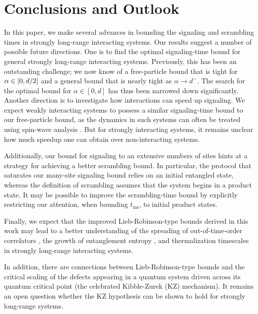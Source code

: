 \section{Conclusions and Outlook}
In this paper, we make several advances in bounding the signaling and scrambling times in strongly long-range interacting systems.
Our results suggest a number of possible future directions.
One is to find the optimal signaling-time bound for general strongly long-range interacting systems.
Previously, this has been an outstanding challenge; we now know of a free-particle bound that is tight for $\alpha \in [0,d/2]$ and a general bound that is nearly tight as $\alpha\rightarrow d^-$.
The search for the optimal bound for $\alpha\in [0,d]$ has thus been narrowed down significantly.
Another direction is to investigate how interactions can speed up signaling.
We expect weakly interacting systems to possess a similar signaling-time bound to our free-particle bound, as the dynamics in such systems can often be treated using spin-wave analysis \cite{Cevolani18}.
But for strongly interacting systems, it remains unclear how much speedup one can obtain over non-interacting systems.

Additionally, our bound for signaling to an extensive numbers of sites hints at a strategy for achieving a better scrambling bound.
In particular, the protocol that saturates our many-site signaling bound relies on an initial entangled state, whereas the definition of scrambling assumes that the system begins in a product state.
It may be possible to improve the scrambling-time bound by explicitly restricting our attention, when bounding $t_\text{ms}$, to initial product states.

Finally, we expect that the improved Lieb-Robinson-type bounds derived in this work may lead to a better understanding of the spreading of out-of-time-order correlators \cite{Luitz19}, the growth of entanglement entropy \cite{Gong2017}, and thermalization timescales \cite{Nandkishore15} in strongly long-range interacting systems.

In addition, there are connections between Lieb-Robinson-type bounds and the critical scaling of the defects appearing in a quantum system driven across its quantum critical point (the celebrated Kibble-Zurek (KZ) mechanism).
It remains an open question whether the KZ hypothesis can be shown to hold for strongly long-range systems.
